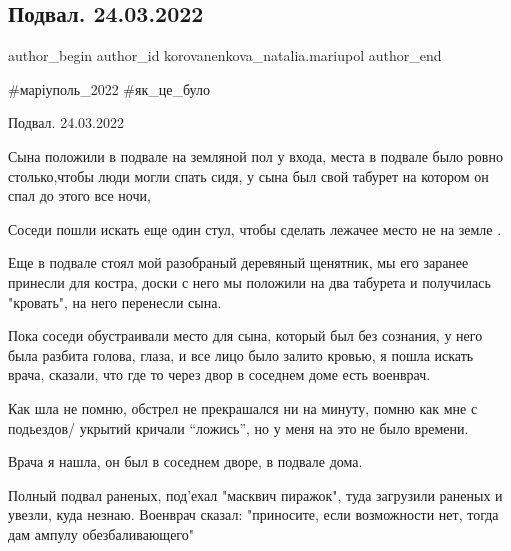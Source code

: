  
 
 
 
 

\subsection{Подвал. 24.03.2022}
\label{sec:24_03_2023.fb.korovanenkova_natalia.mariupol.1.podval_24_03_2022}

\ifcmt
 author_begin
   author_id korovanenkova_natalia.mariupol
 author_end
\fi

\#маріуполь\_2022 \#як\_це\_було

Подвал. 24.03.2022

Сына положили в подвале  на земляной пол у входа, места в подвале было ровно
столько,чтобы люди могли спать сидя, у сына был свой табурет на котором он спал
до этого все ночи, 

Соседи пошли искать еще один стул, чтобы сделать лежачее место не на земле .


Еще в подвале стоял  мой разобраный деревяный щенятник, мы его заранее принесли
для костра, доски с него мы положили на два табурета и получилась "кровать", на
него перенесли сына.

Пока соседи обустраивали место для сына, который был без сознания, у него была
разбита голова, глаза, и все лицо было залито кровью, я пошла искать врача,
сказали, что где то через двор в соседнем доме есть военврач.

Как шла не помню, обстрел не прекрашался ни на минуту, помню  как мне с
подьездов/ укрытий кричали \enquote{ложись}, но у меня на это не было времени.

Врача я нашла, он был в соседнем дворе, в подвале дома.

Полный подвал раненых, под'ехал "масквич пиражок", туда загрузили раненых и
увезли, куда незнаю. Военврач сказал: "приносите, если возможности нет, тогда
дам ампулу обезбаливающего"


